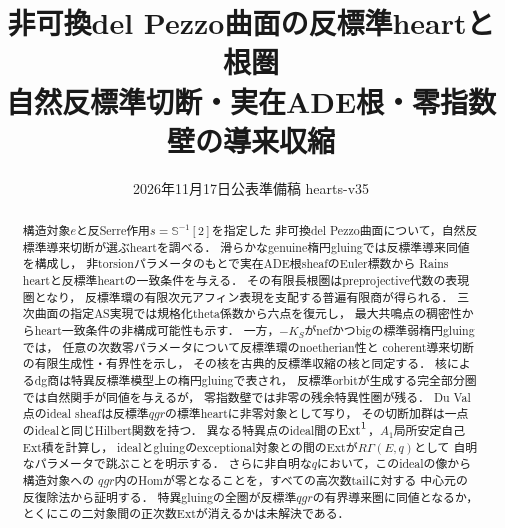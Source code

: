 \documentclass[11pt,a4paper]{ltjsarticle}
\title{非可換del Pezzo曲面の反標準heartと根圏\\
\large 自然反標準切断・実在ADE根・零指数壁の導来収縮}
\author{}
\date{2026年11月17日\qquad 公表準備稿 hearts-v35}
\theoremstyle{definition}
\begin{document}
\maketitle
\begin{abstract}
構造対象$e$と反Serre作用$s=\mathbb S^{-1}[2]$を指定した
非可換del Pezzo曲面について，自然反標準導来切断が選ぶheartを調べる．
滑らかなgenuine楕円gluingでは反標準導来同値を構成し，
非torsionパラメータのもとで実在ADE根sheafのEuler標数から
Rains heartと反標準heartの一致条件を与える．
その有限長根圏はpreprojective代数の表現圏となり，
反標準環の有限次元アフィン表現を支配する普遍有限商が得られる．
三次曲面の指定AS実現では規格化theta係数から六点を復元し，
最大共鳴点の稠密性からheart一致条件の非構成可能性も示す．
一方，$-K_S$がnefかつbigの標準弱楕円gluingでは，
任意の次数零パラメータについて反標準環のnoetherian性と
coherent導来切断の有限生成性・有界性を示し，
その核を古典的反標準収縮の核と同定する．
核によるdg商は特異反標準模型上の楕円gluingで表され，
反標準orbitが生成する完全部分圏では自然関手が同値を与えるが，
零指数壁では非零の残余特異性圏が残る．
Du Val点のideal sheafは反標準$qgr$の標準heartに非零対象として写り，
その切断加群は一点のidealと同じHilbert関数を持つ．
異なる特異点のideal間の$\operatorname{Ext}^1$，$A_1$局所安定自己Ext積を計算し，
idealとgluingのexceptional対象との間のExtが$R\Gamma(E,q)$として
自明なパラメータで跳ぶことを明示する．
さらに非自明な$q$において，このidealの像から構造対象への
$qgr$内のHomが零となることを，すべての高次数tailに対する
中心元の反復除法から証明する．
特異gluingの全圏が反標準$qgr$の有界導来圏に同値となるか，
とくにこの二対象間の正次数Extが消えるかは未解決である．
\end{abstract}
\tableofcontents















\end{document}
